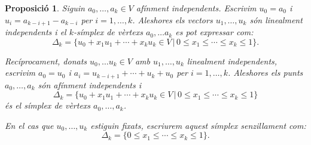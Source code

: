 \documentclass{article}
\newtheorem{proposicio}{Proposici\'{o}}
\theoremstyle{definition}
\begin{document}
\begin{proposicio}\label{Pro:referenciaafin}
Siguin $a_0,\ldots,a_k\in V$ af\'{i}nment independents. Escrivim $u_0=a_0$ i $u_i=a_{k-i+1}-a_{k-i}$ per $i=1,\ldots,k$. Aleshores els vectors $u_1,\ldots,u_k$ s\'{o}n linealment independents i el $k$-s\'{i}mplex de v\`{e}rtexs $a_0,\ldots a_k$ es pot expressar com:
\[\Delta_k=\{u_0+x_1u_1+\cdots+x_ku_k\in V\,|\,0\leq x_1\leq\cdots\leq x_k\leq1\}.\]

Rec\'{i}procament, donats $u_0,\ldots u_k\in V$ amb $u_1,\ldots,u_k$ linealment independents, escrivim $a_0=u_0$ i $a_i=u_{k-i+1}+\cdots+u_k+u_0$ per $i=1,\ldots,k$. Aleshores els punts $a_0,\ldots,a_k$ s\'{o}n af\'{i}nment independents i
\[\Delta_k=\{u_0+x_1u_1+\cdots+x_ku_k\in V\,|\,0\leq x_1\leq\cdots\leq x_k\leq1\}\]
\'{e}s el s\'{i}mplex de v\`{e}rtexs $a_0,\ldots,a_k$.

En el cas que $u_0,\ldots,u_k$ estiguin fixats, escriurem aquest s\'{i}mplex senzillament com:
\[\Delta_k=\{0\leq x_1\leq\cdots\leq x_k\leq1\}.\]
\end{proposicio}
\end{document}
